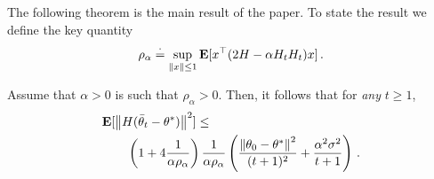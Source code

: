 The following theorem is the main result of the paper.
To state the result we define the key quantity
\begin{align*}
\rho_\alpha\stackrel{\cdot}{=} \sup_{\left\| x\right\|\leq 1} \mathbf{E}[x^\top (2H-\alpha H_tH_t)x]\,.
\end{align*}
\begin{theorem}\label{maintheorem}
Assume that $\alpha>0$ is such that $\rho_\alpha>0$. Then, it follows that for \emph{any} $t\ge 1$,
\begin{align}
\begin{split}
\MoveEqLeft\E[\norm{H(\tb_t-\ts)}^2]\leq \\
&\left(1+4\frac1{\alpha\rho_{\alpha}}\right) \frac{1}{\alpha\rho_{\alpha}}
 \left(\frac{\norm{\theta_0-\ts}^2}{(t+1)^2}+\frac{\alpha^2\sigma^2}{t+1} \right)\,.
\end{split}
\end{align}
\end{theorem}
